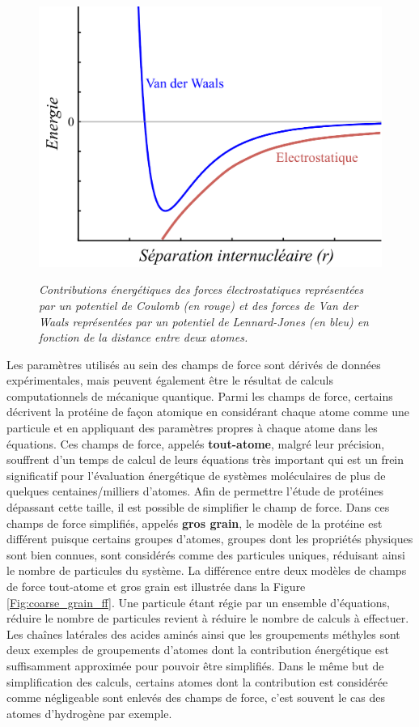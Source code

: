 \begin{figure}
  \centering
  {\includegraphics[width=0.75\linewidth]{./figures/ch1/electro_lennardjones.pdf}}
    \caption[Contributions énergétiques des forces électrostatiques et de van der Waals.]{\it Contributions énergétiques des forces électrostatiques représentées par un potentiel de Coulomb (en rouge) et des forces de Van der Waals représentées par un potentiel de Lennard-Jones (en bleu) en fonction de la distance entre deux atomes.
    }
    \label{Fig:coulomb_lennardjones}
  \hspace{0.2cm}
\end{figure}

Les paramètres utilisés au sein des champs de force sont dérivés de données expérimentales, mais peuvent également être le résultat de calculs computationnels de mécanique quantique. Parmi les champs de force, certains décrivent la protéine de façon atomique en considérant chaque atome comme une particule et en appliquant des paramètres propres à chaque atome dans les équations. Ces champs de force, appelés \textbf{tout-atome}, malgré leur précision, souffrent d'un temps de calcul de leurs équations très important qui est un frein significatif pour l'évaluation énergétique de systèmes moléculaires de plus de quelques centaines/milliers d'atomes. Afin de permettre l'étude de protéines dépassant cette taille, il est possible de simplifier le champ de force. Dans ces champs de force simplifiés, appelés \textbf{gros grain}, le modèle de la protéine est différent puisque certains groupes d'atomes, groupes dont les propriétés physiques sont bien connues, sont considérés comme des particules uniques, réduisant ainsi le nombre de particules du système. La différence entre deux modèles de champs de force tout-atome et gros grain est illustrée dans la Figure \ref{Fig:coarse_grain_ff}. Une particule étant régie par un ensemble d'équations, réduire le nombre de particules revient à réduire le nombre de calculs à effectuer. Les chaînes latérales des acides aminés ainsi que les groupements méthyles sont deux exemples de groupements d'atomes dont la contribution énergétique est suffisamment approximée pour pouvoir être simplifiés. Dans le même but de simplification des calculs, certains atomes dont la contribution est considérée comme négligeable sont enlevés des champs de force, c'est souvent le cas des atomes d'hydrogène par exemple.

